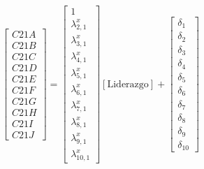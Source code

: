 \documentclass[11pt, a4paper]{article} %
\begin{document}
\begin{equation}
\begin{bmatrix} C21A \\ C21B \\ C21C \\ C21D \\ C21E \\ C21F \\ C21G \\ C21H \\ C21I \\ C21J \end{bmatrix} = \begin{bmatrix} 1 \\ \lambda^x_{2,1} \\ \lambda^x_{3,1} \\ \lambda^x_{4,1} \\ \lambda^x_{5,1} \\ \lambda^x_{6,1} \\ \lambda^x_{7,1} \\ \lambda^x_{8,1} \\ \lambda^x_{9,1} \\ \lambda^x_{10,1} \end{bmatrix} [\text{Liderazgo}] + \begin{bmatrix} \delta_1 \\ \delta_2 \\ \delta_3 \\ \delta_4 \\ \delta_5 \\ \delta_6 \\ \delta_7 \\ \delta_8 \\ \delta_9 \\ \delta_{10} \end{bmatrix}
\end{equation}
\end{document}
